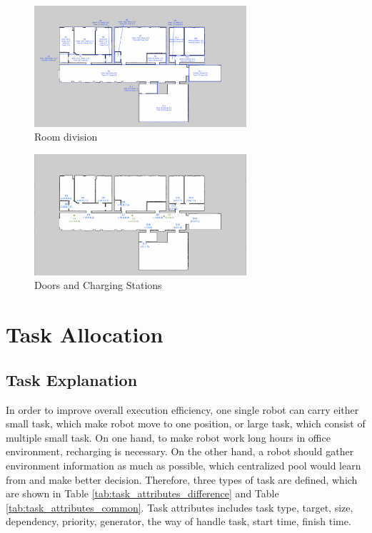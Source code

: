 \begin{figure}[htbp]
	\centering
	\includegraphics[width = 0.7\textwidth]{content/images/ch3/room_division.png}
	\caption{Room division}
	\label{fig:room_division}
\end{figure}

\begin{figure}[htbp]
	\centering
	\includegraphics[width = 0.7\textwidth]{content/images/ch3/positions_door_station.png}
	\caption{Doors and Charging Stations}
	\label{fig:positions_door_station}
\end{figure}

\section{Task Allocation}

\subsection{Task Explanation}
\label{sec:task_explanation}
In order to improve overall execution efficiency, one single robot can carry either small task, which make robot move to one position, or large task, which consist of multiple small task.
On one hand, to make robot work long hours in office environment, recharging is necessary. On the other hand, a robot should gather environment information as much as possible, which centralized pool would learn from and make better decision. 
Therefore, three types of task are defined, which are shown in Table \ref{tab:task_attributes_difference} and Table \ref{tab:task_attributes_common}.  Task attributes includes task type, target, size, dependency, priority, generator, the way of handle task, start time, finish time.

